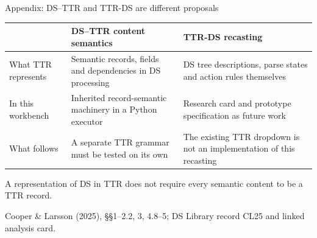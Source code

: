 \documentclass[aspectratio=169,11pt]{beamer}
\newcommand{\keypoint}[1]{\begin{block}{}#1\end{block}}
\newcommand{\source}[1]{\par\vfill{\scriptsize\color{Muted}#1}\par}
\begin{document}
\begin{frame}{Appendix: DS--TTR and TTR-DS are different proposals}
  \color{Ink}
  \small
  \begin{tabularx}{\textwidth}{@{}p{30mm}YY@{}}\toprule
    & \textbf{DS--TTR content semantics} & \textbf{TTR-DS recasting}\\\midrule
    What TTR represents & Semantic records, fields and dependencies in DS processing & DS tree descriptions, parse states and action rules themselves\\[7pt]
    In this workbench & Inherited record-semantic machinery in a Python executor & Research card and prototype specification as future work\\[7pt]
    What follows & A separate TTR grammar must be tested on its own & The existing TTR dropdown is not an implementation of this recasting\\\bottomrule
  \end{tabularx}\par
  \vspace{3mm}
  \normalsize\keypoint{A representation of DS in TTR does not require every semantic content to be a TTR record.}
  \source{Cooper \& Larsson (2025), §§1--2.2, 3, 4.8--5; DS Library record CL25 and linked analysis card.}
\end{frame}
\end{document}
